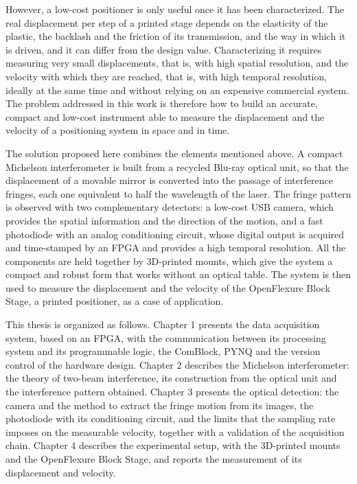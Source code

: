 However, a low-cost positioner is only useful once it has been characterized. The real displacement per step of a printed stage depends on the elasticity of the plastic, the backlash and the friction of its transmission, and the way in which it is driven, and it can differ from the design value. Characterizing it requires measuring very small displacements, that is, with high spatial resolution, and the velocity with which they are reached, that is, with high temporal resolution, ideally at the same time and without relying on an expensive commercial system. The problem addressed in this work is therefore how to build an accurate, compact and low-cost instrument able to measure the displacement and the velocity of a positioning system in space and in time.

The solution proposed here combines the elements mentioned above. A compact Michelson interferometer is built from a recycled Blu-ray optical unit, so that the displacement of a movable mirror is converted into the passage of interference fringes, each one equivalent to half the wavelength of the laser. The fringe pattern is observed with two complementary detectors: a low-cost USB camera, which provides the spatial information and the direction of the motion, and a fast photodiode with an analog conditioning circuit, whose digital output is acquired and time-stamped by an FPGA and provides a high temporal resolution. All the components are held together by 3D-printed mounts, which give the system a compact and robust form that works without an optical table. The system is then used to measure the displacement and the velocity of the OpenFlexure Block Stage, a printed positioner, as a case of application.

This thesis is organized as follows. Chapter 1 presents the data acquisition system, based on an FPGA, with the communication between its processing system and its programmable logic, the ComBlock, PYNQ and the version control of the hardware design. Chapter 2 describes the Michelson interferometer: the theory of two-beam interference, its construction from the optical unit and the interference pattern obtained. Chapter 3 presents the optical detection: the camera and the method to extract the fringe motion from its images, the photodiode with its conditioning circuit, and the limits that the sampling rate imposes on the measurable velocity, together with a validation of the acquisition chain. Chapter 4 describes the experimental setup, with the 3D-printed mounts and the OpenFlexure Block Stage, and reports the measurement of its displacement and velocity.
\newpage